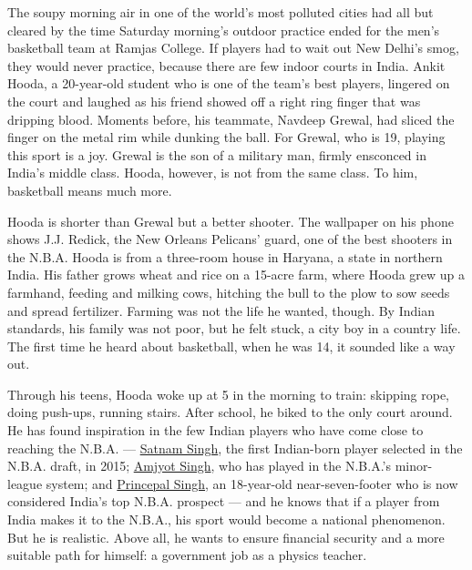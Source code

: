 The soupy morning air in one of the world's most polluted cities had all
but cleared by the time Saturday morning's outdoor practice ended for
the men's basketball team at Ramjas College. If players had to wait out
New Delhi's smog, they would never practice, because there are few
indoor courts in India. Ankit Hooda, a 20-year-old student who is one of
the team's best players, lingered on the court and laughed as his friend
showed off a right ring finger that was dripping blood. Moments before,
his teammate, Navdeep Grewal, had sliced the finger on the metal rim
while dunking the ball. For Grewal, who is 19, playing this sport is a
joy. Grewal is the son of a military man, firmly ensconced in India's
middle class. Hooda, however, is not from the same class. To him,
basketball means much more.

Hooda is shorter than Grewal but a better shooter. The wallpaper on his
phone shows J.J. Redick, the New Orleans Pelicans' guard, one of the
best shooters in the N.B.A. Hooda is from a three-room house in Haryana,
a state in northern India. His father grows wheat and rice on a 15-acre
farm, where Hooda grew up a farmhand, feeding and milking cows, hitching
the bull to the plow to sow seeds and spread fertilizer. Farming was not
the life he wanted, though. By Indian standards, his family was not
poor, but he felt stuck, a city boy in a country life. The first time he
heard about basketball, when he was 14, it sounded like a way out.

Through his teens, Hooda woke up at 5 in the morning to train: skipping
rope, doing push-ups, running stairs. After school, he biked to the only
court around. He has found inspiration in the few Indian players who
have come close to reaching the N.B.A. ---
\href{https://www.nytimes3xbfgragh.onion/2015/07/30/world/asia/satnam-singh-india-nba-basketball.html}{Satnam
Singh}, the first Indian-born player selected in the N.B.A. draft, in
2015; \href{https://gleague.nba.com/player/amjyot-singh/}{Amjyot Singh},
who has played in the N.B.A.'s minor-league system; and
\href{https://in.nba.com/news/princepal-singh-latest-punjabi-star-make-basketball-headlines-jr-nba-academy-india/1pfhe26tjegbl1tc2p7udtphhx}{Princepal
Singh}, an 18-year-old near-seven-footer who is now considered India's
top N.B.A. prospect --- and he knows that if a player from India makes
it to the N.B.A., his sport would become a national phenomenon. But he
is realistic. Above all, he wants to ensure financial security and a
more suitable path for himself: a government job as a physics teacher.

